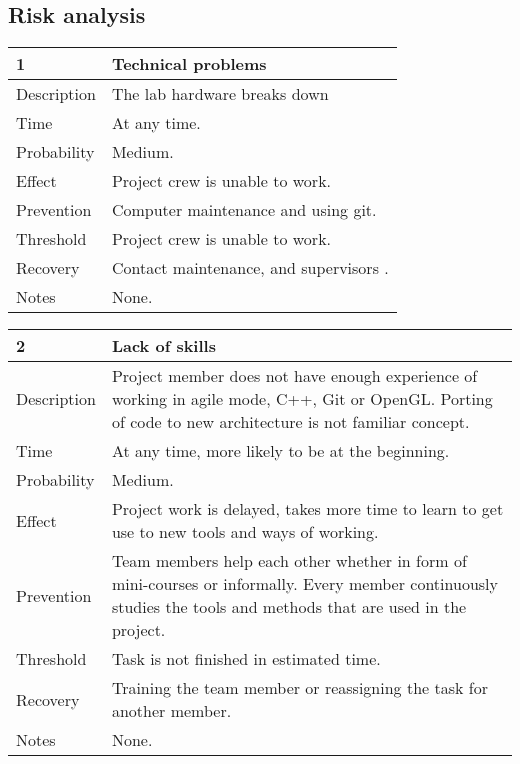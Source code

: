 \documentclass[12pt,titlepage,a4paper]{article}
\begin{document}
	\subsection{Risk analysis}
	
		\begin{center}
		\begin{tabular}{|l|p{10cm}|}
			\hline
			\textbf{1} & \textbf{Technical problems} \\
			\hline
			\hline
			Description & The lab hardware breaks down \\
			\hline
			Time & At any time. \\
			\hline
			Probability & Medium. \\
			\hline
			Effect & Project crew is unable to work. \\
			\hline
			Prevention & Computer maintenance and using git. \\
			\hline
			Threshold & Project crew is unable to work. \\
			\hline
			Recovery & Contact maintenance, and supervisors . \\
			\hline
			Notes & None. \\
			\hline
		\end{tabular}
		\end{center}
		
		\begin{center}
		\begin{tabular}{|l|p{10cm}|}
			\hline
			\textbf{2} & \textbf{Lack of skills} \\
			\hline
			\hline
			Description & Project member does not have enough experience of working in agile mode,  C++, Git or OpenGL.
			Porting of code to new architecture is not familiar concept. \\
			\hline
			Time & At any time, more likely to be at the beginning. \\
			\hline
			Probability & Medium. \\
			\hline
			Effect & Project work is delayed, takes more time to learn to get use to new tools and ways of working. \\
			\hline
			Prevention & Team members help each other whether in form of mini-courses or informally. Every member 		
			continuously studies the tools and methods that are used in the project. \\
			\hline
			Threshold & Task is not finished in estimated time. \\
			\hline
			Recovery & Training the team member or reassigning the task for another member. \\
			\hline
			Notes & None. \\
			\hline
		\end{tabular}
		\end{center}
		
\end{document}
